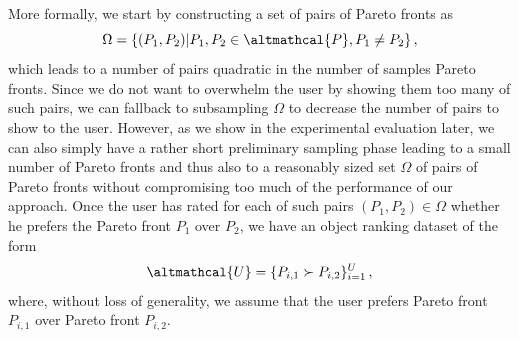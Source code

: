 More formally, we start by constructing a set of pairs of Pareto fronts as 
\begin{equation}
    \Omega = \{ (P_1, P_2) \vert P_1,P_2 \in \altmathcal{P}, P_1 \neq P_2\} \, ,
\end{equation}
which leads to a number of pairs quadratic in the number of samples Pareto fronts. Since we do not want to overwhelm the user by showing them too many of such pairs, we can fallback to subsampling $\Omega$ to decrease the number of pairs to show to the user. However, as we show in the experimental evaluation later, we can also simply have a rather short preliminary sampling phase leading to a small number of Pareto fronts and thus also to a reasonably sized set $\Omega$ of pairs of Pareto fronts without compromising too much of the performance of our approach.
Once the user has rated for each of such pairs $(P_1, P_2) \in \Omega$ whether he prefers the Pareto front $P_1$ over $P_2$, we have an object ranking dataset of the form
\begin{equation}\label{moo-eq:object_ranking_dataset}
    \altmathcal{U} = \{ P_{i,1} \succ P_{i,2}\}_{i=1}^U \, ,
\end{equation} where, without loss of generality, we assume that the user prefers Pareto front $P_{i,1}$ over Pareto front $P_{i,2}$. 

